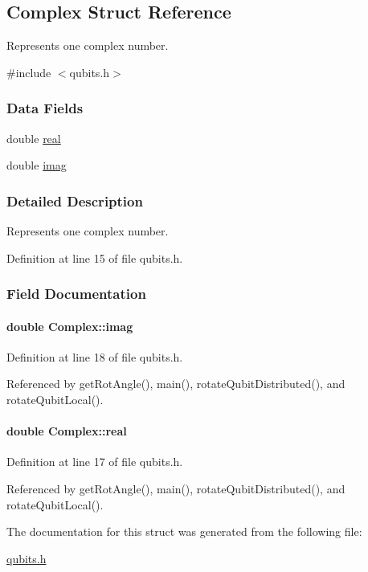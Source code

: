 \hypertarget{structComplex}{
\subsection{Complex Struct Reference}
\label{structComplex}
}


Represents one complex number.  


{\ttfamily \#include $<$qubits.h$>$}\subsubsection*{Data Fields}
\begin{DoxyCompactItemize}
\item 
double \hyperlink{structComplex_a0138f5fe2b2c6180b8fcda77a7aa51c5}{real}
\item 
double \hyperlink{structComplex_a2bb90cc563599c3c8bdec9acf9ea40a6}{imag}
\end{DoxyCompactItemize}


\subsubsection{Detailed Description}
Represents one complex number. 

Definition at line 15 of file qubits.h.

\subsubsection{Field Documentation}
\hypertarget{structComplex_a2bb90cc563599c3c8bdec9acf9ea40a6}{
\paragraph[{imag}]{\setlength{\rightskip}{0pt plus 5cm}double {\bf Complex::imag}}\hfill}
\label{structComplex_a2bb90cc563599c3c8bdec9acf9ea40a6}


Definition at line 18 of file qubits.h.

Referenced by getRotAngle(), main(), rotateQubitDistributed(), and rotateQubitLocal().\hypertarget{structComplex_a0138f5fe2b2c6180b8fcda77a7aa51c5}{
\paragraph[{real}]{\setlength{\rightskip}{0pt plus 5cm}double {\bf Complex::real}}\hfill}
\label{structComplex_a0138f5fe2b2c6180b8fcda77a7aa51c5}


Definition at line 17 of file qubits.h.

Referenced by getRotAngle(), main(), rotateQubitDistributed(), and rotateQubitLocal().

The documentation for this struct was generated from the following file:\begin{DoxyCompactItemize}
\item 
\hyperlink{qubits_8h}{qubits.h}\end{DoxyCompactItemize}
